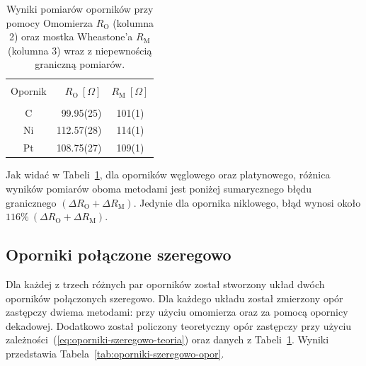 \documentclass[twocolumn, a4paper, polish, 10pt]{article}
\newcommand{\RO}{\ensuremath{ R_{\mathrm{O}} }}
\newcommand{\RM}{\ensuremath{ R_{\mathrm{M}} }}
\begin{document}
\begin{table}[ht]
\begin{center}
\renewcommand*{\tablename}{Tabela}
\caption{\small
Wyniki pomiarów oporników przy pomocy Omomierza $\RO$ (kolumna 2) oraz mostka Wheastone’a $\RM$ (kolumna 3) wraz z niepewnością graniczną pomiarów.
\vspace{0.15cm}
    \label{tab:oporniki-opor}}
    {\small
    \begin{tabular}{c r c}
    \hline \vspace{-0.35cm} \\
      Opornik & $\RO~[\Omega]$ 
      & $\RM~[\Omega]$ \\
      \hline \vspace{-0.2cm} \\
      C  &  99.95(25) & 101(1) \\
      Ni & 112.57(28) & 114(1) \\
      Pt & 108.75(27) & 109(1) \\
    \hline
    \end{tabular}}
    \end{center}
\end{table}

Jak widać w Tabeli~\ref{tab:oporniki-opor}, dla oporników węglowego oraz platynowego, różnica wyników pomiarów oboma metodami jest poniżej sumarycznego błędu granicznego ${(\Delta \RO +\Delta \RM)}$. Jedynie dla opornika niklowego, błąd wynosi około ${116\%~(\Delta \RO +\Delta \RM)}$.

\subsection{Oporniki połączone szeregowo}
Dla każdej z trzech różnych par oporników został stworzony układ dwóch oporników połączonych szeregowo. Dla każdego układu został zmierzony opór zastępczy dwiema metodami: przy użyciu omomierza oraz za pomocą opornicy dekadowej. Dodatkowo został policzony teoretyczny opór zastępczy przy użyciu zależności~(\ref{eq:oporniki-szeregowo-teoria}) oraz danych z Tabeli~\ref{tab:oporniki-opor}. Wyniki przedstawia Tabela~\ref{tab:oporniki-szeregowo-opor}.
\end{document}
